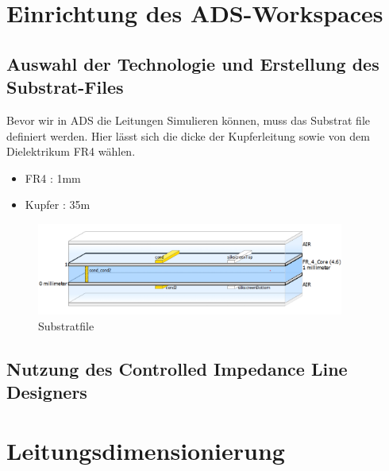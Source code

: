 \section{Einrichtung des ADS-Workspaces}

    \subsection{Auswahl der Technologie und Erstellung des Substrat-Files}
    Bevor wir in ADS die Leitungen Simulieren können, muss das Substrat file definiert werden.
    Hier lässt sich die dicke der Kupferleitung sowie von dem Dielektrikum FR4 wählen.
        \begin{itemize}
            \item FR4    : 1mm
            \item Kupfer : 35\textmu m
        \end{itemize}
        \begin{figure}[H]
            \centering
            \includegraphics[width=0.9\textwidth]{Pictures/substratFile.png}
            \caption{Substratfile}
        \end{figure}

    \subsection{Nutzung des Controlled Impedance Line Designers}

\section{Leitungsdimensionierung}
